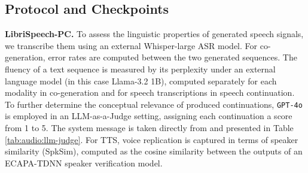 




\subsection{Protocol and Checkpoints} \label{app:audio:protocol}

\textbf{LibriSpeech-PC.} To assess the linguistic properties of generated speech signals, we transcribe them using an external Whisper-large \citep{audio:whisper} ASR model. For co-generation, error rates are computed between the two generated sequences. The fluency of a text sequence is measured by its perplexity under an external language model (in this case Llama-3.2 1B), computed separately for each modality in co-generation and for speech transcriptions in speech continuation. To further determine the conceptual relevance of produced continuations, \texttt{GPT-4o} is employed in an LLM-as-a-Judge setting, assigning each continuation a score from 1 to 5. The system message is taken directly from \cite{audio:taste} and presented in Table \ref{tab:audio:llm-judge}. For TTS, voice replication is captured in terms of speaker similarity (SpkSim), computed as the cosine similarity between the outputs of an ECAPA-TDNN \citep{audio:ecapa-tdnn} speaker verification model.

